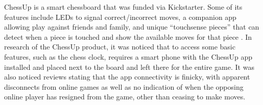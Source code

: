 \documentclass[11pt,journal]{IEEEtran}
\begin{document}



ChessUp is a smart chessboard that was funded via Kickstarter. Some of its features include LEDs to signal correct/incorrect moves, a companion app allowing play against friends and family, and unique ``touchsense pieces'' that can detect when a piece is touched and show the available moves for that piece \cite{chessup}. In research of the ChessUp product, it was noticed that to access some basic features, such as the chess clock, requires a smart phone with the ChessUp app installed and placed next to the board and left there for the entire game. It was also noticed reviews stating that the app connectivity is finicky, with apparent disconnects from online games as well as no indication of when the opposing online player has resigned from the game, other than ceasing to make moves.
\end{document}
